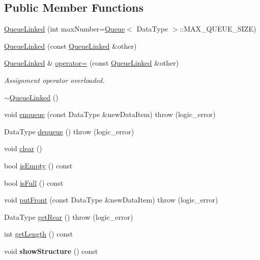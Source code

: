 \subsection*{Public Member Functions}
\begin{DoxyCompactItemize}
\item 
\hyperlink{class_queue_linked_ad356fca32ffd90c78d35d3eb5d84504b}{Queue\+Linked} (int max\+Number=\hyperlink{class_queue}{Queue}$<$ Data\+Type $>$\+::M\+A\+X\+\_\+\+Q\+U\+E\+U\+E\+\_\+\+S\+I\+Z\+E)
\item 
\hyperlink{class_queue_linked_ad8749850191f8a4165c8e3a3a266bada}{Queue\+Linked} (const \hyperlink{class_queue_linked}{Queue\+Linked} \&other)
\item 
\hypertarget{class_queue_linked_acec147d4de2139d2b6fd511bca6d6299}{\hyperlink{class_queue_linked}{Queue\+Linked} \& \hyperlink{class_queue_linked_acec147d4de2139d2b6fd511bca6d6299}{operator=} (const \hyperlink{class_queue_linked}{Queue\+Linked} \&other)}\label{class_queue_linked_acec147d4de2139d2b6fd511bca6d6299}

\begin{DoxyCompactList}\small\item\em Assignment operator overloaded. \end{DoxyCompactList}\item 
\hyperlink{class_queue_linked_aed85fa73c60384a3d0c676c0ebbbca19}{$\sim$\+Queue\+Linked} ()
\item 
void \hyperlink{class_queue_linked_a7196448729d053f85f255674c7a57a02}{enqueue} (const Data\+Type \&new\+Data\+Item)  throw (logic\+\_\+error)
\item 
Data\+Type \hyperlink{class_queue_linked_ac0656892f605af3b952c71706d3af55d}{dequeue} ()  throw (logic\+\_\+error)
\item 
void \hyperlink{class_queue_linked_a32c66945765e5d42bbb988b1cdf43886}{clear} ()
\item 
bool \hyperlink{class_queue_linked_a425b83383323217c924a41a0226f7022}{is\+Empty} () const 
\item 
bool \hyperlink{class_queue_linked_a3de199675ee629f9d20c48d0e2b65f71}{is\+Full} () const 
\item 
void \hyperlink{class_queue_linked_a838a51b8023f9cf3a5a24abb67ae1ee4}{put\+Front} (const Data\+Type \&new\+Data\+Item)  throw (logic\+\_\+error)
\item 
Data\+Type \hyperlink{class_queue_linked_a2934f746096e31b9728de11f42bdc3cd}{get\+Rear} ()  throw (logic\+\_\+error)
\item 
int \hyperlink{class_queue_linked_ab2d7fc0a927f3fe1e2ac44cc042bb961}{get\+Length} () const 
\item 
\hypertarget{class_queue_linked_a57d5dd5336545ddc7d1b22cee40fb017}{void {\bfseries show\+Structure} () const }\label{class_queue_linked_a57d5dd5336545ddc7d1b22cee40fb017}

\end{DoxyCompactItemize}
